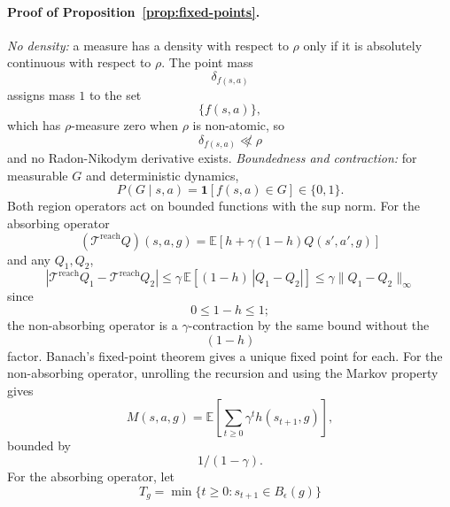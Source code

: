 \documentclass{article}
\newcommand{\E}{\mathbb{E}}
\newcommand{\ind}[1]{\mathbf{1}\!\left[#1\right]}
\newcommand{\Reach}{\mathrm{reach}}
\begin{document}
\paragraph{Proof of Proposition~\ref{prop:fixed-points}.}
\emph{No density:} a measure has a density with respect to $\rho$ only if it is absolutely continuous with respect to $\rho$.
The point mass
\begin{equation}
\delta_{f(s,a)}
\end{equation}
assigns mass $1$ to the set
\begin{equation}
\{f(s,a)\},
\end{equation}
which has $\rho$-measure zero when $\rho$ is non-atomic, so
\begin{equation}
\delta_{f(s,a)}\not\ll\rho
\end{equation}
and no Radon-Nikodym derivative exists.
\emph{Boundedness and contraction:} for measurable $G$ and deterministic dynamics,
\begin{equation}
P(G\mid s,a)=\ind{f(s,a)\in G}\in\{0,1\}.
\end{equation}
Both region operators act on bounded functions with the sup norm.
For the absorbing operator
\begin{equation}
(\mathcal{T}^{\Reach}Q)(s,a,g)=\E[h+\gamma(1-h)Q(s',a',g)]
\end{equation}
and any $Q_1,Q_2$,
\begin{equation*}
|\mathcal{T}^{\Reach}Q_1-\mathcal{T}^{\Reach}Q_2| \le\gamma\,\E[(1-h)\,|Q_1-Q_2|]\le\gamma\|Q_1-Q_2\|_\infty
\end{equation*}
since
\begin{equation}
0\le 1-h\le 1;
\end{equation}
the non-absorbing operator is a $\gamma$-contraction by the same bound without the
\begin{equation}
(1-h)
\end{equation}
factor.
Banach's fixed-point theorem gives a unique fixed point for each.
For the non-absorbing operator, unrolling the recursion and using the Markov property gives
\begin{equation*}
M(s,a,g)=\E[\sum_{t\ge0}\gamma^{t}h(s_{t+1},g)],
\end{equation*}
bounded by
\begin{equation}
1/(1-\gamma).
\end{equation}
For the absorbing operator, let
\begin{equation}
T_g=\min\{t\ge0:s_{t+1}\in B_\epsilon(g)\}
\end{equation}
\end{document}
